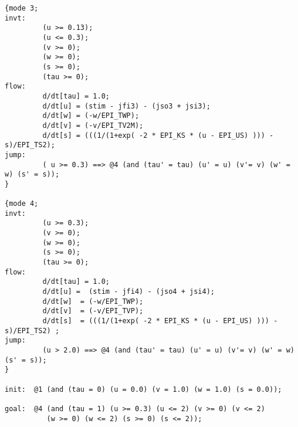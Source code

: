 \begin{Verbatim}[fontsize=\scriptsize]
{mode 3;
invt:
         (u >= 0.13);
         (u <= 0.3);
         (v >= 0);
         (w >= 0);
         (s >= 0);
         (tau >= 0);
flow:
         d/dt[tau] = 1.0;
         d/dt[u] = (stim - jfi3) - (jso3 + jsi3);
         d/dt[w] = (-w/EPI_TWP);
         d/dt[v] = (-v/EPI_TV2M);
         d/dt[s] = (((1/(1+exp( -2 * EPI_KS * (u - EPI_US) ))) - s)/EPI_TS2);
jump:
         ( u >= 0.3) ==> @4 (and (tau' = tau) (u' = u) (v'= v) (w' = w) (s' = s));
}

{mode 4;
invt:
         (u >= 0.3);
         (v >= 0);
         (w >= 0);
         (s >= 0);
         (tau >= 0);
flow:
         d/dt[tau] = 1.0;
         d/dt[u] =  (stim - jfi4) - (jso4 + jsi4);
         d/dt[w]  = (-w/EPI_TWP);
         d/dt[v]  = (-v/EPI_TVP);
         d/dt[s]  = (((1/(1+exp( -2 * EPI_KS * (u - EPI_US) ))) - s)/EPI_TS2) ;
jump:
         (u > 2.0) ==> @4 (and (tau' = tau) (u' = u) (v'= v) (w' = w) (s' = s));
}

init:  @1 (and (tau = 0) (u = 0.0) (v = 1.0) (w = 1.0) (s = 0.0));

goal:  @4 (and (tau = 1) (u >= 0.3) (u <= 2) (v >= 0) (v <= 2) 
          (w >= 0) (w <= 2) (s >= 0) (s <= 2));
\end{Verbatim}

